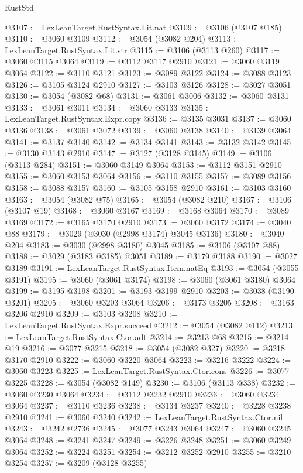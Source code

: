\begin{lexlean}{RustStd}
\begin{coremodule}
@3107 := LexLeanTarget.RustSyntax.Lit.nat
@3109 := @3106 (@3107 @185)
@3110 := @3060 @3109
@3112 := @3054 (@3082 @204)
@3113 := LexLeanTarget.RustSyntax.Lit.str
@3115 := @3106 (@3113 @260)
@3117 := @3060 @3115 @3064
@3119 := @3112 @3117 @2910
@3121 := @3060 @3119 @3064
@3122 := @3110 @3121
@3123 := @3089 @3122
@3124 := @3088 @3123
@3126 := @3105 @3124 @2910
@3127 := @3103 @3126
@3128 := @3027 @3051
@3130 := @3054 (@3082 @68)
@3131 := @3061 @3006
@3132 := @3060 @3131
@3133 := @3061 @3011
@3134 := @3060 @3133
@3135 := LexLeanTarget.RustSyntax.Expr.copy
@3136 := @3135 @3031
@3137 := @3060 @3136
@3138 := @3061 @3072
@3139 := @3060 @3138
@3140 := @3139 @3064
@3141 := @3137 @3140
@3142 := @3134 @3141
@3143 := @3132 @3142
@3145 := @3130 @3143 @2910
@3147 := @3127 (@3128 @3145)
@3149 := @3106 (@3113 @284)
@3151 := @3060 @3149 @3064
@3153 := @3112 @3151 @2910
@3155 := @3060 @3153 @3064
@3156 := @3110 @3155
@3157 := @3089 @3156
@3158 := @3088 @3157
@3160 := @3105 @3158 @2910
@3161 := @3103 @3160
@3163 := @3054 (@3082 @75)
@3165 := @3054 (@3082 @210)
@3167 := @3106 (@3107 @19)
@3168 := @3060 @3167
@3169 := @3168 @3064
@3170 := @3089 @3169
@3172 := @3165 @3170 @2910
@3173 := @3060 @3172
@3174 := @3040 @88
@3179 := @3029 (@3030 (@2998 @3174) @3045 @3136)
@3180 := @3040 @204
@3183 := @3030 (@2998 @3180) @3045
@3185 := @3106 (@3107 @88)
@3188 := @3029 (@3183 @3185) @3051
@3189 := @3179 @3188
@3190 := @3027 @3189
@3191 := LexLeanTarget.RustSyntax.Item.natEq
@3193 := @3054 (@3055 @3191)
@3195 := @3060 (@3061 @3174)
@3198 := @3060 (@3061 @3180) @3064
@3199 := @3195 @3198
@3201 := @3193 @3199 @2910
@3203 := @3038 (@3190 @3201)
@3205 := @3060 @3203 @3064
@3206 := @3173 @3205
@3208 := @3163 @3206 @2910
@3209 := @3103 @3208
@3210 := LexLeanTarget.RustSyntax.Expr.succeed
@3212 := @3054 (@3082 @112)
@3213 := LexLeanTarget.RustSyntax.Ctor.adt
@3214 := @3213 @68
@3215 := @3214 @19
@3216 := @3077 @3215
@3218 := @3054 (@3082 @327)
@3220 := @3218 @3170 @2910
@3222 := @3060 @3220 @3064
@3223 := @3216 @3222
@3224 := @3060 @3223
@3225 := LexLeanTarget.RustSyntax.Ctor.cons
@3226 := @3077 @3225
@3228 := @3054 (@3082 @149)
@3230 := @3106 (@3113 @338)
@3232 := @3060 @3230 @3064
@3234 := @3112 @3232 @2910
@3236 := @3060 @3234 @3064
@3237 := @3110 @3236
@3238 := @3134 @3237
@3240 := @3228 @3238 @2910
@3241 := @3060 @3240
@3242 := LexLeanTarget.RustSyntax.Ctor.nil
@3243 := @3242 @2736
@3245 := @3077 @3243 @3064
@3247 := @3060 @3245 @3064
@3248 := @3241 @3247
@3249 := @3226 @3248
@3251 := @3060 @3249 @3064
@3252 := @3224 @3251
@3254 := @3212 @3252 @2910
@3255 := @3210 @3254
@3257 := @3209 (@3128 @3255)

\end{coremodule}
\end{lexlean}
